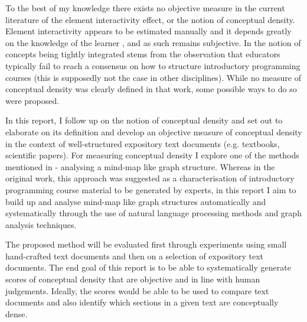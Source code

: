 \documentclass[12pt]{article}
\begin{document}
To the best of my knowledge there exists no objective measure in the current literature of the element interactivity effect, or the notion of conceptual density. Element interactivity appears to be estimated manually and it depends greatly on the knowledge of the learner \citep{chandler1996cognitive}, and as such remains subjective. In \citep{robins2010learning} the notion of concepts being tightly integrated stems from the observation that educators typically fail to reach a consensus on how to structure introductory programming courses (this is supposedly not the case in other disciplines).  While no measure of conceptual density was clearly defined in that work, some possible ways to do so were proposed.

In this report,  I follow up on the notion of conceptual density and set out to elaborate on its definition and develop an objective measure of conceptual density in the context of well-structured expository text documents (e.g. textbooks, scientific papers). For measuring conceptual density I explore one of the methods mentioned in \citep{robins2010learning} - analysing a mind-map like graph structure. Whereas in the original work, this approach was suggested as a characterisation of  introductory programming course material to be generated by experts, in this report I aim to build up and analyse mind-map like graph structures automatically and systematically through the use of natural language processing methods and graph analysis techniques.

The proposed method will be evaluated first through experiments using small hand-crafted text documents and then on a selection of expository text documents. The end goal of this report is to be able to systematically generate scores of conceptual density that are objective and in line with human judgements. Ideally, the scores would be able to be used to compare text documents and also identify which sections in a given text are conceptually dense.

\end{document}
